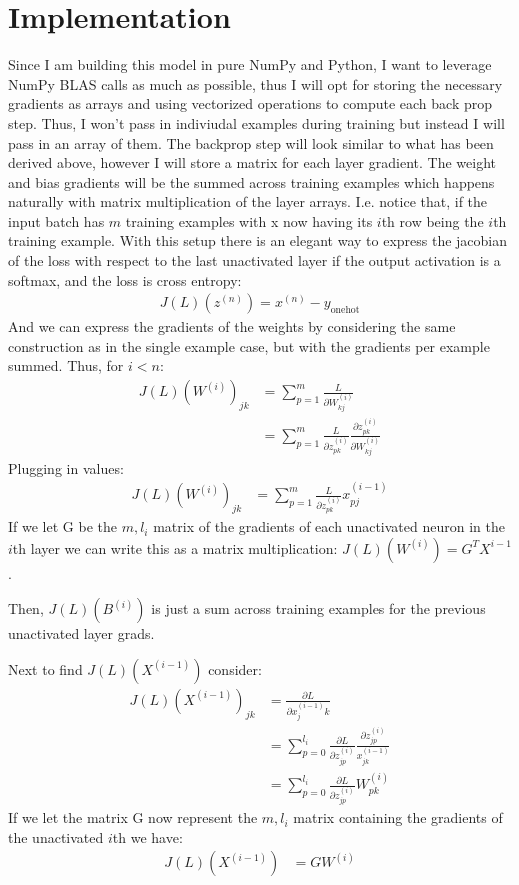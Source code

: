 \documentclass[12pt]{article}
\begin{document}
\section*{Implementation}
Since I am building this model in pure NumPy and Python, I want to leverage
NumPy BLAS calls as much as possible, thus I will opt for storing the necessary gradients
as arrays and using vectorized operations to compute each back prop step. Thus, I won't pass in indiviudal
examples during training but instead I will pass in an array of them. The backprop step will look similar to what has
been derived above, however I will store a matrix for each layer gradient. The weight and bias gradients
will be the summed across training examples which happens naturally with matrix multiplication of the layer arrays.
I.e. notice that, if the input batch has $m$ training examples with x now having its $i$th row
being the $i$th training example. With this setup there is an elegant way
to express the jacobian of the loss with respect to the last unactivated layer if the output
activation is a softmax, and the loss is cross entropy:
\begin{align*}
    J(L)(z^{(n)}) = x^{(n)} - y_{\text{onehot}}
\end{align*}
And we can express the gradients of the weights by considering the same
construction as in the single example case, but with the gradients per example
summed. Thus, for $i < n$:
\begin{align*}
    J(L)(W^{(i)})_{jk} &= \sum_{p=1}^{m}\frac{L}{\partial W^{(i)}_{kj}} \\
    &= \sum_{p=1}^{m}\frac{L}{\partial z^{(i)}_{pk}}\frac{\partial z^{(i)}_{pk}}{\partial W^{(i)}_{kj}}
\end{align*}
Plugging in values:
\begin{align*}
    J(L)(W^{(i)})_{jk} &= \sum_{p=1}^{m}\frac{L}{\partial z^{(i)}_{pk}}x_{pj}^{(i-1)}
\end{align*}
If we let G be the $m, l_i$ matrix of the gradients of each unactivated neuron in the $i$th layer
we can write this as a matrix multiplication: $J(L)(W^{(i)}) = G^TX^{i-1}$.


Then, $J(L)(B^{(i)})$ is just a sum across training examples for the previous unactivated layer grads. 


Next to find $J(L)(X^{(i-1)})$ consider:
\begin{align*}
    J(L)(X^{(i-1)})_{jk} &= \frac{\partial L}{\partial x^{(i-1)}_jk} \\
    &= \sum_{p = 0}^{l_i}\frac{\partial L}{\partial z^{(i)}_{jp}}\frac{\partial z^{(i)}_{jp}}{x^{(i-1)}_{jk}} \\
    &= \sum_{p = 0}^{l_i}\frac{\partial L}{\partial z^{(i)}_{jp}}W^{(i)}_{pk}
\end{align*}
If we let the matrix G now represent the $m, l_i$ matrix containing the gradients
of the unactivated $i$th we have:
\begin{align*}
    J(L)(X^{(i-1)}) &= GW^{(i)}
\end{align*}
\end{document}
